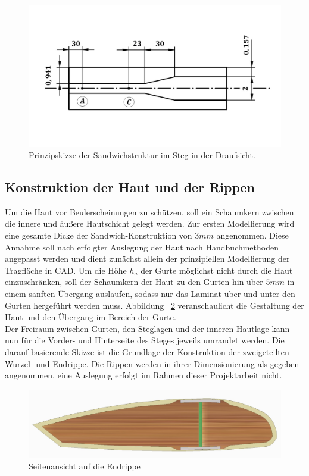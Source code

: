 \begin{figure}[h]
	\includegraphics[width=1.0\textwidth]{Bilder/StegPrinzip.jpg}
	\caption{Prinzipskizze der Sandwichstruktur im Steg in der Draufsicht.}
	\label{fig: Steg}
\end{figure}


\subsection{Konstruktion der Haut und der Rippen}
Um die Haut vor Beulerscheinungen zu schützen, soll ein Schaumkern zwischen die innere und äußere Hautschicht gelegt werden. Zur ersten Modellierung wird eine gesamte Dicke der Sandwich-Konstruktion von $ 3mm $ angenommen. Diese Annahme soll nach erfolgter Auslegung der Haut nach Handbuchmethoden angepasst werden und dient zunächst allein der prinzipiellen Modellierung der Tragfläche in CAD. Um die Höhe $ h_{a} $ der Gurte möglichst nicht durch die Haut einzuschränken, soll der Schaumkern der Haut zu den Gurten hin über $ 5mm $ in einem sanften Übergang auslaufen, sodass nur das Laminat über und unter den Gurten hergeführt werden muss. Abbildung ~\ref{fig: Seite} veranschaulicht die Gestaltung der Haut und den Übergang im Bereich der Gurte.\\

\noindent Der Freiraum zwischen Gurten, den Steglagen und der inneren Hautlage kann nun für die Vorder- und Hinterseite des Steges jeweils umrandet werden. Die darauf basierende Skizze ist die Grundlage der Konstruktion der zweigeteilten Wurzel- und Endrippe. Die Rippen werden in ihrer Dimensionierung als gegeben angenommen, eine Auslegung erfolgt im Rahmen dieser Projektarbeit nicht.\\

\begin{figure}[h]
	\includegraphics[width=1.0\textwidth]{Bilder/Seite.jpg}
	\caption{Seitenansicht auf die Endrippe}
	\label{fig: Seite}
\end{figure}

